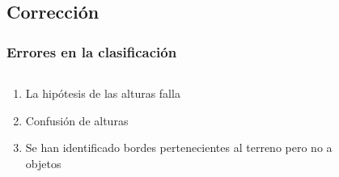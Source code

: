 \subsection{Corrección}
\begin{frame}
  \frametitle{Errores en la clasificación}
  \begin{columns}
    \begin{column}{0.5\textwidth}
      \begin{enumerate}[<+->]
    	\item La hipótesis de las alturas falla
        \item Confusión de alturas
    	\item Se han identificado bordes pertenecientes al terreno pero no a objetos
     \end{enumerate}
    \end{column}
   \begin{column}{0.45\textwidth}
   \begin{figure}[h!]
   \centering
   \end{figure}
   \end{column}
  \end{columns}
\end{frame}
